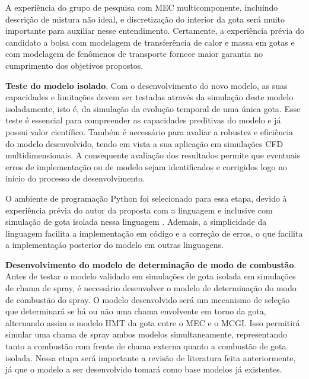 A experiência do grupo de pesquisa com MEC multicomponente, incluindo descrição de mistura não ideal, e discretização do interior da gota será muito importante para auxiliar nesse entendimento.
Certamente, a experiência prévia do candidato a bolsa com modelagem de transferência de calor e massa em gotas \cite{HenningsJ2024MT} e com modelagem de fenômenos de transporte \cite{HenningsJ2023BT,DokozaT2024,DokozaT2025,DeBroeckL2025} fornece maior garantia no cumprimento dos objetivos propostos. %

\textbf{Teste do modelo isolado}.
Com o desenvolvimento do novo modelo, as suas capacidades e limitações devem ser testadas através da simulação deste modelo isoladamente, isto é, da simulação da evolução temporal de uma única gota. %
Esse teste é essencial para compreender as capacidades preditivas do modelo e já possui valor científico. Também é necessário para avaliar a robustez e eficiência do modelo desenvolvido, tendo em vista a sua aplicação em simulações CFD multidimensionais.
A consequente avaliação dos resultados permite que eventuais erros de implementação ou de modelo sejam identificados e corrigidos logo no início do processo de desenvolvimento.

O ambiente de programação Python foi selecionado para essa etapa, devido à experiência prévia do autor da proposta com a linguagem e inclusive com simulação de gota isolada nessa linguagem \cite{HenningsJ2024MT}.
Ademais, a simplicidade da linguagem facilita a implementação em código e a correção de erros, o que facilita a implementação posterior do modelo em outras linguagens.

\textbf{Desenvolvimento do modelo de determinação de modo de combustão}.
Antes de testar o modelo validado em simulações de gota isolada em simulações de chama de spray, é necessário desenvolver o modelo de determinação do modo de combustão do spray.
O modelo desenvolvido será um mecanismo de seleção que determinará se há ou não uma chama envolvente em torno da gota, alternando assim o modelo HMT da gota entre o MEC e o MCGI.
Isso permitirá simular uma chama de spray ambos modelos simultaneamente, representando tanto a combustão com frente de chama externa quanto a combustão de gota isolada.
Nessa etapa será importante a revisão de literatura feita anteriormente, já que o modelo a ser desenvolvido tomará como base modelos já existentes.


